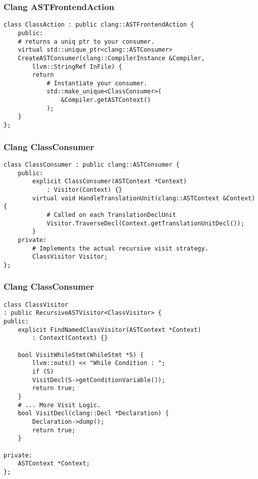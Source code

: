 \documentclass{beamer}
\begin{document}
\begin{frame}[fragile]
	\frametitle{Clang ASTFrontendAction}
		\begin{verbatim}
class ClassAction : public clang::ASTFrontendAction {
	public:
	# returns a uniq ptr to your consumer.
	virtual std::unique_ptr<clang::ASTConsumer>
	CreateASTConsumer(clang::CompilerInstance &Compiler, 
		llvm::StringRef InFile) {
		return 
			# Instantiate your consumer. 
			std::make_unique<ClassConsumer>(
				&Compiler.getASTContext()
			);
	}
};
	\end{verbatim}
\end{frame}

\begin{frame}[fragile]
	\frametitle{Clang ClassConsumer}
	\begin{verbatim}
class ClassConsumer : public clang::ASTConsumer {
	public:
		explicit ClassConsumer(ASTContext *Context) 
			: Visitor(Context) {}
		virtual void HandleTranslationUnit(clang::ASTContext &Context) {
			# Called on each TranslationDeclUnit
			Visitor.TraverseDecl(Context.getTranslationUnitDecl());
		}
	private:
		# Implements the actual recursive visit strategy.
		ClassVisitor Visitor;
};
	\end{verbatim}
\end{frame}

\begin{frame}[fragile]
	\frametitle{Clang ClassConsumer}
	\begin{verbatim}
class ClassVisitor
: public RecursiveASTVisitor<ClassVisitor> {
public:
	explicit FindNamedClassVisitor(ASTContext *Context) 
		: Context(Context) {}
	
	bool VisitWhileStmt(WhileStmt *S) {
		llvm::outs() << "While Condition : ";
		if (S)
		VisitDecl(S->getConditionVariable());
		return true;
	}
	# ... More Visit Logic. 
	bool VisitDecl(clang::Decl *Declaration) {
		Declaration->dump();
		return true;
	}

private:
	ASTContext *Context;
};
	\end{verbatim}
\end{frame}
\end{document}
